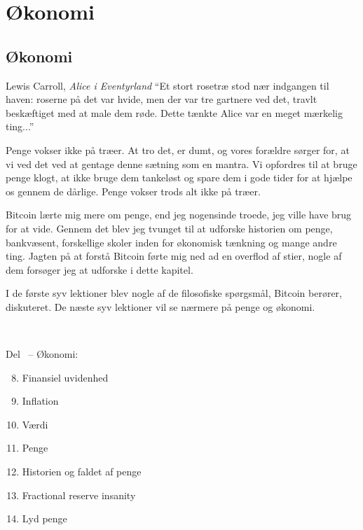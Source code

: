\part{Økonomi}
\label{ch:økonomi}
\chapter*{Økonomi}

\begin{chapquote}{Lewis Carroll, \textit{Alice i Eventyrland}}
\enquote{Et stort rosetræ stod nær indgangen til haven: roserne på det var 
hvide, men der var tre gartnere ved det, travlt beskæftiget med at male dem 
røde. Dette tænkte Alice var en meget mærkelig ting...}
\end{chapquote}

Penge vokser ikke på træer. At tro det, er dumt, og vores forældre sørger for, 
at vi ved det ved at gentage denne sætning som en mantra. Vi opfordres til at 
bruge penge klogt, at ikke bruge dem tankeløst og spare dem i gode tider for at 
hjælpe os gennem de dårlige. Penge vokser trods alt ikke på træer.

Bitcoin lærte mig mere om penge, end jeg nogensinde troede, jeg ville have brug 
for at vide. Gennem det blev jeg tvunget til at udforske historien om penge, 
bankvæsent, forskellige skoler inden for økonomisk tænkning og mange andre ting. 
Jagten på at forstå Bitcoin førte mig ned ad en overflod af stier, nogle af dem 
forsøger jeg at udforske i dette kapitel.

I de første syv lektioner blev nogle af de filosofiske spørgsmål, Bitcoin 
berører, diskuteret. De næste syv lektioner vil se nærmere på penge og økonomi.

~

\begin{samepage}
Del~\ref{ch:økonomi} -- Økonomi:

\begin{enumerate}
  \setcounter{enumi}{7}
  \item Finansiel uvidenhed
  \item Inflation
  \item Værdi
  \item Penge
  \item Historien og faldet af penge
  \item Fractional reserve insanity
  \item Lyd penge
\end{enumerate}
\end{samepage}

